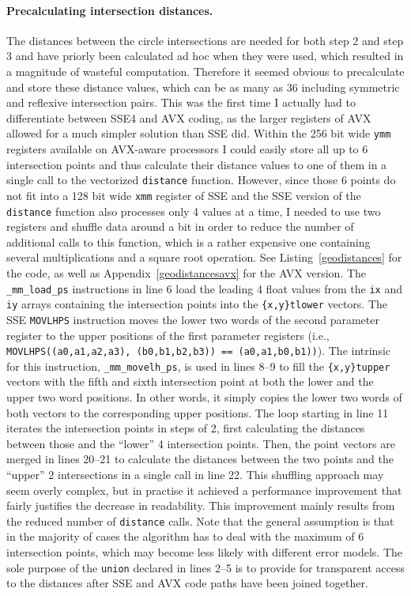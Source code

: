 \paragraph{Precalculating intersection distances.} The distances between the circle intersections are needed for both step 2 and step 3 and have priorly been calculated ad hoc when they were used, which resulted in a magnitude of wasteful computation. Therefore it seemed obvious to precalculate and store these distance values, which can be as many as 36 including symmetric and reflexive intersection pairs. This was the first time I actually had to differentiate between SSE4 and AVX coding, as the larger registers of AVX allowed for a much simpler solution than SSE did. Within the 256 bit wide \texttt{ymm} registers available on AVX-aware processors I could easily store all up to 6 intersection points and thus calculate their distance values to one of them in a single call to the vectorized \texttt{distance} function. However, since those 6 points do not fit into a 128 bit wide \texttt{xmm} register of SSE and the SSE version of the \texttt{distance} function also processes only 4 values at a time, I needed to use two registers and shuffle data around a bit in order to reduce the number of additional calls to this function, which is a rather expensive one containing several multiplications and a square root operation. See Listing~\ref{geodistances} for the code, as well as Appendix~\ref{geodistancesavx} for the AVX version. The \texttt{\_mm\_load\_ps} instructions in line 6 load the leading 4 float values from the \texttt{ix} and \texttt{iy} arrays containing the intersection points into the \texttt{\{x,y\}tlower} vectors. The SSE \texttt{MOVLHPS} instruction moves the lower two words of the second parameter register to the upper positions of the first parameter registers (i.e., \texttt{MOVLHPS((a0,a1,a2,a3), (b0,b1,b2,b3)) == (a0,a1,b0,b1))}). The intrinsic for this instruction, \texttt{\_mm\_movelh\_ps}, is used in lines 8--9 to fill the \texttt{\{x,y\}tupper} vectors with the fifth and sixth intersection point at both the lower and the upper two word positions. In other words, it simply copies the lower two words of both vectors to the corresponding upper positions. The loop starting in line 11 iterates the intersection points in steps of 2, first calculating the distances between those and the ``lower'' 4 intersection points. Then, the point vectors are merged in lines 20--21 to calculate the distances between the two points and the ``upper'' 2 intersections in a single call in line 22. This shuffling approach may seem overly complex, but in practise it achieved a performance improvement that fairly justifies the decrease in readability. This improvement mainly results from the reduced number of \texttt{distance} calls. Note that the general assumption is that in the majority of cases the algorithm has to deal with the maximum of 6 intersection points, which may become less likely with different error models. The sole purpose of the \texttt{union} declared in lines 2--5 is to provide for transparent access to the distances after SSE and AVX code paths have been joined together.

